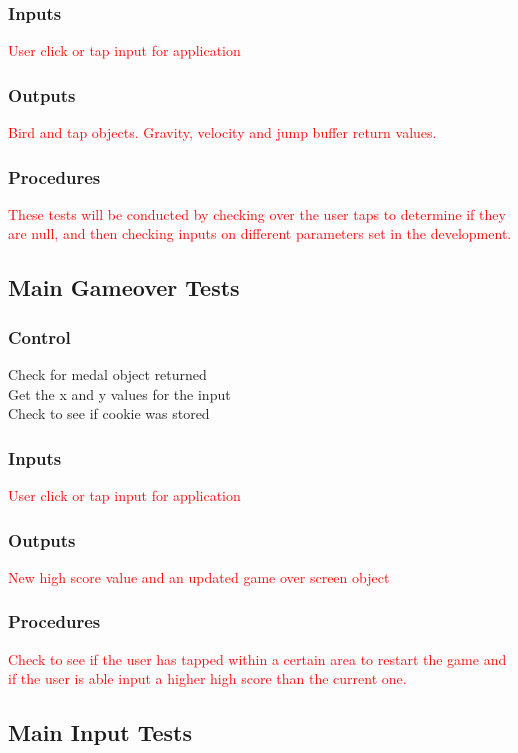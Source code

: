 \documentclass[11pt, oneside]{article}   	%
\begin{document}
\subsubsection{Inputs}
\textcolor{red}{User click or tap input for application}

\subsubsection{Outputs}
\textcolor{red}{Bird and tap objects. Gravity, velocity and jump buffer return values. } 

\subsubsection{Procedures}
\textcolor{red}{These tests will be conducted by checking over the user taps to determine if they are null, and then checking inputs on different parameters set in the development.}

\subsection{Main Gameover Tests}
\subsubsection{Control}
Check for medal object returned \\ 
Get the x and y values for the input \\
Check to see if cookie was stored \\ 
\subsubsection{Inputs}
\textcolor{red}{User click or tap input for application}

\subsubsection{Outputs}
\textcolor{red}{New high score value and an updated game over screen object}

\subsubsection{Procedures}
\textcolor{red}{Check to see if the user has tapped within a certain area to restart the game and if the user is able input a higher high score than the current one.}


\subsection{Main Input Tests}
\end{document}
